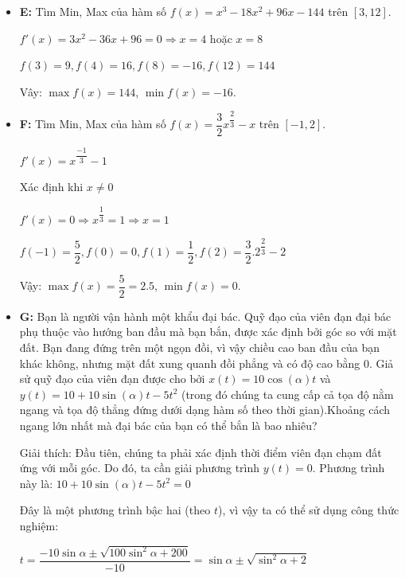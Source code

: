 \documentclass[12pt,a4paper]{article}
\begin{document}
\begin{itemize}
    Xét $x < -1$, ta có: $f(x) = -(x + 1) \Rightarrow f'(x) = -1$

    Suy ra $f(x)$ không khả vi tại $x = -1$

    $\lim_{x \to \pm\infty} f(x) = +\infty$

    $f(-1) = 0$
    
    Vậy hàm số có cực tiểu địa phương tại $x=-1$.
    \item \textbf{E:} Tìm Min, Max của hàm số $f(x)=x^3-18x^2+96x-144$ trên $[3,12]$.

    $f'(x) = 3x^2 - 36x + 96 = 0 \Rightarrow x = 4$ hoặc $x = 8$

    $f(3) = 9, f(4) = 16, f(8) = -16, f(12) = 144$
    
    Vây: $\max f(x) = 144$, $\min f(x) = -16$.
    \item \textbf{F:} Tìm Min, Max của hàm số $f(x)=\dfrac{3}{2}x^{\dfrac{2}{3}}-x$ trên $[-1,2]$. 

    $f'(x) = x^{\dfrac{-1}{3}} - 1$

    Xác định khi $x \ne 0$

    $f'(x) = 0 \Rightarrow x^{\dfrac{1}{3}} = 1 \Rightarrow x = 1$

    $f(-1) = \dfrac{5}{2}, f(0) = 0, f(1) = \dfrac{1}{2}, f(2) = \dfrac{3}{2}.2^{\dfrac{2}{3}} - 2$
    
    Vậy: $\max f(x) = \dfrac{5}{2} = 2.5$, $\min f(x) = 0$.

    \item \textbf{G:} Bạn là người vận hành một khẩu đại bác. Quỹ đạo của viên đạn đại bác phụ thuộc vào hướng ban đầu mà bạn bắn, được xác định bởi góc so với mặt đất. Bạn đang đứng trên một ngọn đồi, vì vậy chiều cao ban đầu của bạn khác không, nhưng mặt đất xung quanh đồi phẳng và có độ cao bằng 0. Giả sử quỹ đạo của viên đạn được cho bởi $x(t) = 10\cos (\alpha) t$ và $y(t) = 10 + 10 \sin (\alpha) t - 5t^2$ (trong đó chúng ta cung cấp cả tọa độ nằm ngang và tọa độ thẳng đứng dưới dạng hàm số theo thời gian).Khoảng cách ngang lớn nhất mà đại bác của bạn có thể bắn là bao nhiêu?
    
    Giải thích: Đầu tiên, chúng ta phải xác định thời điểm viên đạn chạm đất ứng với mỗi góc. Do đó, ta cần giải phương trình $y(t) = 0$. Phương trình này là: $10 + 10 \sin (\alpha) t - 5t^2 = 0$
    
    Đây là một phương trình bậc hai (theo $t$), vì vậy ta có thể sử dụng công thức nghiệm:

    $t = \dfrac{-10\sin \alpha \pm \sqrt{100\sin^2\alpha + 200}}{-10} = \sin \alpha \pm \sqrt{\sin ^2 \alpha + 2}$
    

\end{itemize}
\end{document}
